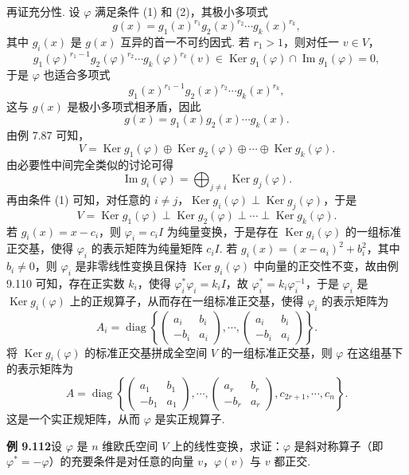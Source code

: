 \documentclass[UTF8, 12pt, fontset=fandol, oneside]{ctexart}
\begin{document}
再证充分性. 设 $\varphi$ 满足条件 (1) 和 (2)，其极小多项式
\[
g(x)=g_1(x)^{r_1}g_2(x)^{r_2}\cdots g_k(x)^{r_k},
\]
其中 $g_i(x)$ 是 $g(x)$ 互异的首一不可约因式. 若 $r_1>1$，则对任一 $v\in V$，
\[
g_1(\varphi)^{r_1-1}g_2(\varphi)^{r_2}\cdots g_k(\varphi)^{r_k}(v)\in\operatorname{Ker}g_1(\varphi)\cap\operatorname{Im}g_1(\varphi)=0,
\]
于是 $\varphi$ 也适合多项式
\[
g_1(x)^{r_1-1}g_2(x)^{r_2}\cdots g_k(x)^{r_k},
\]
这与 $g(x)$ 是极小多项式相矛盾，因此
\[
g(x)=g_1(x)g_2(x)\cdots g_k(x).
\]
由例 7.87 可知，
\[
V=\operatorname{Ker}g_1(\varphi)\oplus\operatorname{Ker}g_2(\varphi)\oplus\cdots\oplus\operatorname{Ker}g_k(\varphi).
\]
由必要性中间完全类似的讨论可得
\[
\operatorname{Im}g_i(\varphi)=\bigoplus_{j\ne i}\operatorname{Ker}g_j(\varphi).
\]
再由条件 (1) 可知，对任意的 $i\ne j$，$\operatorname{Ker}g_i(\varphi)\perp\operatorname{Ker}g_j(\varphi)$，于是
\[
V=\operatorname{Ker}g_1(\varphi)\perp\operatorname{Ker}g_2(\varphi)\perp\cdots\perp\operatorname{Ker}g_k(\varphi).
\]
若 $g_i(x)=x-c_i$，则 $\varphi_i=c_iI$ 为纯量变换，于是存在 $\operatorname{Ker}g_i(\varphi)$ 的一组标准正交基，使得 $\varphi_i$ 的表示矩阵为纯量矩阵 $c_iI$. 若 $g_i(x)=(x-a_i)^2+b_i^2$，其中 $b_i\ne0$，则 $\varphi_i$ 是非零线性变换且保持 $\operatorname{Ker}g_i(\varphi)$ 中向量的正交性不变，故由例 9.110 可知，存在正实数 $k_i$，使得 $\varphi_i^*\varphi_i=k_iI$，故 $\varphi_i^*=k_i\varphi_i^{-1}$，于是 $\varphi_i$ 是 $\operatorname{Ker}g_i(\varphi)$ 上的正规算子，从而存在一组标准正交基，使得 $\varphi_i$ 的表示矩阵为
\[
A_i=\operatorname{diag}\left\{
\begin{pmatrix}
a_i&b_i\\
-b_i&a_i
\end{pmatrix},\cdots,
\begin{pmatrix}
a_i&b_i\\
-b_i&a_i
\end{pmatrix}
\right\}.
\]
将 $\operatorname{Ker}g_i(\varphi)$ 的标准正交基拼成全空间 $V$ 的一组标准正交基，则 $\varphi$ 在这组基下的表示矩阵为
\[
A=\operatorname{diag}\left\{
\begin{pmatrix}
a_1&b_1\\
-b_1&a_1
\end{pmatrix},\cdots,
\begin{pmatrix}
a_r&b_r\\
-b_r&a_r
\end{pmatrix},
c_{2r+1},\cdots,c_n
\right\}.
\]
这是一个实正规矩阵，从而 $\varphi$ 是实正规算子.

\noindent\textbf{例 9.112}\quad 设 $\varphi$ 是 $n$ 维欧氏空间 $V$ 上的线性变换，求证：$\varphi$ 是斜对称算子（即 $\varphi^*=-\varphi$）的充要条件是对任意的向量 $v$，$\varphi(v)$ 与 $v$ 都正交.
\end{document}

